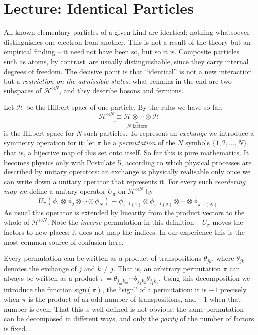 
\section{Lecture: Identical Particles}
All known elementary particles of a given kind are identical: nothing whatsoever distinguishes one electron from another. This is not a result of the theory but an empirical finding -- it need not have been so, but so it is. Composite particles such as atoms, by contrast, are usually distinguishable, since they carry internal degrees of freedom. The decisive point is that ``identical'' is not a new interaction but a \emph{restriction on the admissible states}: what remains in the end are two subspaces of $\mathcal{H}^{\otimes N}$, and they describe bosons and fermions.

Let $\mathcal{H}$ be the Hilbert space of one particle. By the rules we have so far,
\begin{equation}
  \mathcal{H}^{\otimes N} \underbrace{\equiv \mathcal{H}\otimes \cdots \otimes \mathcal{H}}_{\text{$N$ factors}}
\end{equation}
is the Hilbert space for $N$ such particles. To represent an \emph{exchange} we introduce a symmetry operation for it: let $\pi$ be a \emph{permutation} of the $N$ symbols $\{1,2, \ldots,N\}$, that is, a bijective map of this set onto itself. So far this is pure mathematics. It becomes physics only with Postulate 5, according to which physical processes are described by unitary operators: an exchange is physically realisable only once we can write down a unitary operator that represents it. For every such \emph{reordering map} we define
a unitary operator $U_\pi$ on $\mathcal{H}^{\otimes N}$ by
\begin{equation}
  U_\pi (\phi_1\otimes\phi_2\otimes \cdots\otimes \phi_N) \equiv \phi_{\pi^{-1}(1)}\otimes\phi_{\pi^{-1}(2)}\otimes \cdots\otimes \phi_{\pi^{-1}(N)}.
\end{equation}
As usual this operator is extended by linearity from the product vectors to the whole of $\mathcal{H}^{\otimes N}$. Note the \emph{inverse} permutation in this definition -- $U_\pi$ moves the factors to new places; it does not map the indices. In our experience this is the most common source of confusion here.

Every permutation can be written as a product of transpositions $\theta_{jk}$, where $\theta_{jk}$
denotes the exchange of $j$ and $k\not=j$. That is, an arbitrary permutation $\pi$ can always be written as a product $\pi = \theta_{j_mk_m}\cdots\theta_{j_2k_2}\theta_{j_1k_1}$. Using this decomposition we introduce the function $\text{sign}(\pi)$, the ``sign'' of a permutation: it is
$-1$ precisely when $\pi$ is the product of an odd number of transpositions, and $+1$ when that number is even. That this is well defined is not obvious: the same permutation can be decomposed in different ways, and only the \emph{parity} of the number of factors is fixed.

